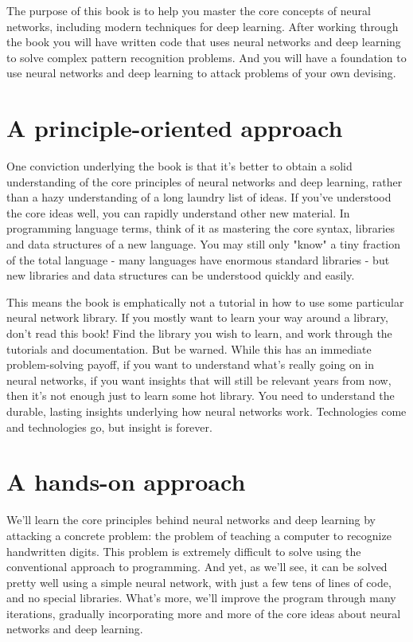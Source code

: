 \documentclass[a4paper,12pt]{report}%
\begin{document}
The purpose of this book is to help you master the core concepts of neural networks, including modern techniques for deep learning. After working through the book you will have written code that uses neural networks and deep learning to solve complex pattern recognition problems. And you will have a foundation to use neural networks and deep learning to attack problems of your own devising.

\section{A principle-oriented approach}
One conviction underlying the book is that it's better to obtain a solid understanding of the core principles of neural networks and deep learning, rather than a hazy understanding of a long laundry list of ideas. If you've understood the core ideas well, you can rapidly understand other new material. In programming language terms, think of it as mastering the core syntax, libraries and data structures of a new language. You may still only "know" a tiny fraction of the total language - many languages have enormous standard libraries - but new libraries and data structures can be understood quickly and easily.

This means the book is emphatically not a tutorial in how to use some particular neural network library. If you mostly want to learn your way around a library, don't read this book! Find the library you wish to learn, and work through the tutorials and documentation. But be warned. While this has an immediate problem-solving payoff, if you want to understand what's really going on in neural networks, if you want insights that will still be relevant years from now, then it's not enough just to learn some hot library. You need to understand the durable, lasting insights underlying how neural networks work. Technologies come and technologies go, but insight is forever.

\section{A hands-on approach}
We'll learn the core principles behind neural networks and deep learning by attacking a concrete problem: the problem of teaching a computer to recognize handwritten digits. This problem is extremely difficult to solve using the conventional approach to programming. And yet, as we'll see, it can be solved pretty well using a simple neural network, with just a few tens of lines of code, and no special libraries. What's more, we'll improve the program through many iterations, gradually incorporating more and more of the core ideas about neural networks and deep learning.
\end{document}
